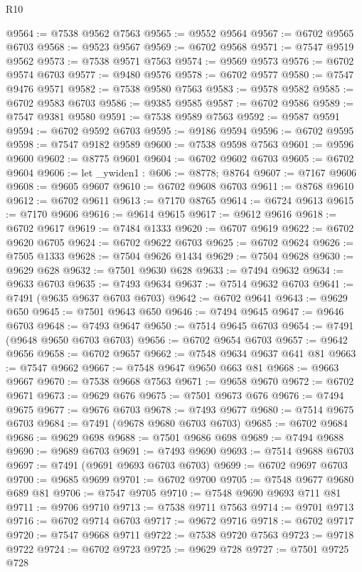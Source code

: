 \begin{lexlean}{R10}
\begin{coremodule}
@9564 := @7538 @9562 @7563
@9565 := @9552 @9564
@9567 := @6702 @9565 @6703
@9568 := @9523 @9567
@9569 := @6702 @9568
@9571 := @7547 @9519 @9562
@9573 := @7538 @9571 @7563
@9574 := @9569 @9573
@9576 := @6702 @9574 @6703
@9577 := @9480 @9576
@9578 := @6702 @9577
@9580 := @7547 @9476 @9571
@9582 := @7538 @9580 @7563
@9583 := @9578 @9582
@9585 := @6702 @9583 @6703
@9586 := @9385 @9585
@9587 := @6702 @9586
@9589 := @7547 @9381 @9580
@9591 := @7538 @9589 @7563
@9592 := @9587 @9591
@9594 := @6702 @9592 @6703
@9595 := @9186 @9594
@9596 := @6702 @9595
@9598 := @7547 @9182 @9589
@9600 := @7538 @9598 @7563
@9601 := @9596 @9600
@9602 := @8775 @9601
@9604 := @6702 @9602 @6703
@9605 := @6702 @9604
@9606 := let _ywiden1 : @606 := @8778; @8764
@9607 := @7167 @9606
@9608 := @9605 @9607
@9610 := @6702 @9608 @6703
@9611 := @8768 @9610
@9612 := @6702 @9611
@9613 := @7170 @8765
@9614 := @6724 @9613
@9615 := @7170 @9606
@9616 := @9614 @9615
@9617 := @9612 @9616
@9618 := @6702 @9617
@9619 := @7484 @1333
@9620 := @6707 @9619
@9622 := @6702 @9620 @6705
@9624 := @6702 @9622 @6703
@9625 := @6702 @9624
@9626 := @7505 @1333
@9628 := @7504 @9626 @1434
@9629 := @7504 @9628
@9630 := @9629 @628
@9632 := @7501 @9630 @628
@9633 := @7494 @9632
@9634 := @9633 @6703
@9635 := @7493 @9634
@9637 := @7514 @9632 @6703
@9641 := @7491 (@9635 @9637 @6703 @6703)
@9642 := @6702 @9641
@9643 := @9629 @650
@9645 := @7501 @9643 @650
@9646 := @7494 @9645
@9647 := @9646 @6703
@9648 := @7493 @9647
@9650 := @7514 @9645 @6703
@9654 := @7491 (@9648 @9650 @6703 @6703)
@9656 := @6702 @9654 @6703
@9657 := @9642 @9656
@9658 := @6702 @9657
@9662 := @7548 @9634 @9637 @641 @81
@9663 := @7547 @9662
@9667 := @7548 @9647 @9650 @663 @81
@9668 := @9663 @9667
@9670 := @7538 @9668 @7563
@9671 := @9658 @9670
@9672 := @6702 @9671
@9673 := @9629 @676
@9675 := @7501 @9673 @676
@9676 := @7494 @9675
@9677 := @9676 @6703
@9678 := @7493 @9677
@9680 := @7514 @9675 @6703
@9684 := @7491 (@9678 @9680 @6703 @6703)
@9685 := @6702 @9684
@9686 := @9629 @698
@9688 := @7501 @9686 @698
@9689 := @7494 @9688
@9690 := @9689 @6703
@9691 := @7493 @9690
@9693 := @7514 @9688 @6703
@9697 := @7491 (@9691 @9693 @6703 @6703)
@9699 := @6702 @9697 @6703
@9700 := @9685 @9699
@9701 := @6702 @9700
@9705 := @7548 @9677 @9680 @689 @81
@9706 := @7547 @9705
@9710 := @7548 @9690 @9693 @711 @81
@9711 := @9706 @9710
@9713 := @7538 @9711 @7563
@9714 := @9701 @9713
@9716 := @6702 @9714 @6703
@9717 := @9672 @9716
@9718 := @6702 @9717
@9720 := @7547 @9668 @9711
@9722 := @7538 @9720 @7563
@9723 := @9718 @9722
@9724 := @6702 @9723
@9725 := @9629 @728
@9727 := @7501 @9725 @728

\end{coremodule}
\end{lexlean}
